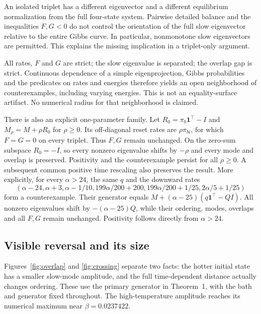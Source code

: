 \documentclass[11pt]{article}
\begin{document}
An isolated triplet has a different eigenvector and a different equilibrium normalization from the full four-state system. Pairwise detailed balance and the inequalities $F,G<0$ do not control the orientation of the full slow eigenvector relative to the entire Gibbs curve. In particular, nonmonotone slow eigenvectors are permitted. This explains the missing implication in a triplet-only argument.

All rates, $F$ and $G$ are strict; the slow eigenvalue is separated; the overlap gap is strict. Continuous dependence of a simple eigenprojection, Gibbs probabilities and the predicates on rates and energies therefore yields an open neighborhood of counterexamples, including varying energies. This is not an equality-surface artifact. No numerical radius for that neighborhood is claimed.

There is also an explicit one-parameter family. Let $R_0=\pi_b\mathbf1^\top-I$ and $M_\rho=M+\rho R_0$ for $\rho\geq0$. Its off-diagonal reset rates are $\rho\pi_{bi}$, for which $F=G=0$ on every triplet. Thus $F,G$ remain unchanged. On the zero-sum subspace $R_0=-I$, so every nonzero eigenvalue shifts by $-\rho$ and every mode and overlap is preserved. Positivity and the counterexample persist for all $\rho\geq0$. A subsequent common positive time rescaling also preserves the result. More explicitly, for every $\alpha>24$, the same $q$ and the downward rates
\[
(\alpha-24,\alpha+3,\alpha-1/10,
199\alpha/200+200,199\alpha/200+1/25,2\alpha/5+1/25)
\]
form a counterexample. Their generator equals $M+(\alpha-25)(q\mathbf1^\top-QI)$. All nonzero eigenvalues shift by $-(\alpha-25)Q$, while their ordering, modes, overlaps and all $F,G$ remain unchanged. Positivity follows directly from $\alpha>24$.

\subsection{Visible reversal and its size}
Figures~\ref{fig:overlap} and \ref{fig:crossing} separate two facts: the hotter initial state has a smaller slow-mode amplitude, and the full time-dependent distance actually changes ordering. These use the primary generator in Theorem~1, with the bath and generator fixed throughout. The high-temperature amplitude reaches its numerical maximum near $\beta=0.0237422$.
\end{document}
